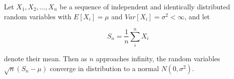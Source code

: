 \documentclass{article}
\begin{document}
Let $X_1, X_2, \ldots, X_n$ be a sequence of independent and identically distributed random variables with $E[X_i] = \mu$ and $Var[X_i] = \sigma^2 < \infty$, and let

\begin{equation}
S_n = \frac{1}{n}\sum_{i}^{n} X_i
\end{equation}

denote their mean. Then as $n$ approaches infinity, the random variables $\sqrt{n}(S_n - \mu)$ converge in distribution to a normal $N(0, \sigma^2)$.
\end{document}
